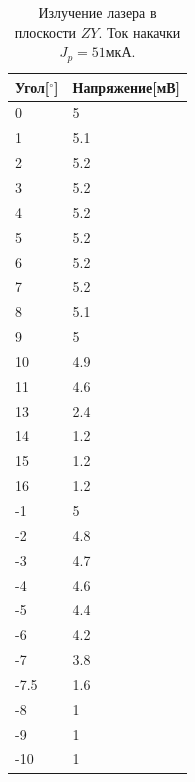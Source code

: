 \documentclass[a4paper, 12pt]{extarticle}
\begin{document}
\begin{table}
    \begin{center}
        

\begin{tabular}{|l|l|}
    \hline
    Угол[$^{\circ}$]&Напряжение[мВ]\\
    \hline
    0&5\\
    1&5.1\\
    2&5.2\\
    3&5.2\\
    4&5.2\\
    5&5.2\\
    6&5.2\\
    7&5.2\\
    8&5.1\\
    9&5\\
    10&4.9\\
    11&4.6\\
    13&2.4\\
    14&1.2\\
    15&1.2\\
    16&1.2\\
    -1&5\\
    -2&4.8\\
    -3&4.7\\
    -4&4.6\\
    -5&4.4\\
    -6&4.2\\
    -7&3.8\\
    -7.5&1.6\\
    -8&1\\
    -9&1\\
    -10&1\\
    \hline
\end{tabular}


    
    \end{center}
    \caption{Излучение лазера в плоскости $ZY$. Ток накачки $J_p = 51\text{мкА}$.}
    \label{tab:ZY_51}
    \end{table}
    
\end{document}
